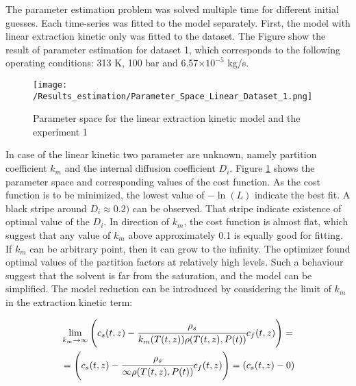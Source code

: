 \documentclass[../Supercritical_fluid_extraction_of_essential_oil_from_chamomile.tex]{subfiles}
\begin{document}
	
	\label{CH: Results}
	
	The parameter estimation problem was solved multiple time for different initial guesses. Each time-series was fitted to the model separately. First, the model with linear extraction kinetic only was fitted to the dataset. The Figure show the result of parameter estimation for dataset 1, which corresponds to the following operating conditions: 313 K, 100 bar and 6.57$\times 10^{-5}$ kg/s.
	
	\begin{figure}[!h]
		\centering
		\texttt{[image: /Results\_estimation/Parameter\_Space\_Linear\_Dataset\_1.png]}
		\caption{Parameter space for the linear extraction kinetic model and the experiment 1}
		\label{fig: Fit_1_linear}
	\end{figure}
	
	In case of the linear kinetic two parameter are unknown, namely partition coefficient $k_m$ and the internal diffusion coefficient $D_i$. Figure \ref{fig: Fit_1_linear} shows the parameter space and corresponding values of the cost function. As the cost function is to be minimized, the lowest value of $-\ln(L)$ indicate the best fit. A black stripe around $D_i \approx 0.2)$ can be observed. That stripe indicate existence of optimal value of the $D_i$. In direction of $k_m$, the cost function is almost flat, which suggest that any value of $k_m$ above approximately 0.1 is equally good for fitting. If $k_m$ can be arbitrary point, then it can grow to the infinity. The optimizer found optimal values of the partition factors at relatively high levels. Such a behaviour suggest that the solvent is far from the saturation, and the model can be simplified. The model reduction can be introduced by considering the limit of $k_m$ in the extraction kinetic term: 
	
	{\footnotesize
		\begin{equation*}
			\begin{split}
				&\lim_{k_m \rightarrow \infty} \left({\color{black}{\color{black} c_s} }(t,z)  - \cfrac{{\color{black}\rho_s}}{{\color{black}k_m}({\color{black}T}(t,z)){\color{black}\rho}({\color{black}T}(t,z),{\color{black}P}(t))}  {\color{black}c_f}(t,z) \right)  = \\
				&= \left({\color{black}{\color{black} c_s} }(t,z)  - \cfrac{{\color{black}\rho_s}}{\infty{\color{black}\rho}({\color{black}T}(t,z),{\color{black}P}(t))}  {\color{black}c_f}(t,z) \right) = \left({\color{black}{\color{black} c_s} }(t,z) - 0 \right)
			\end{split}
	\end{equation*} }
	
\end{document}
